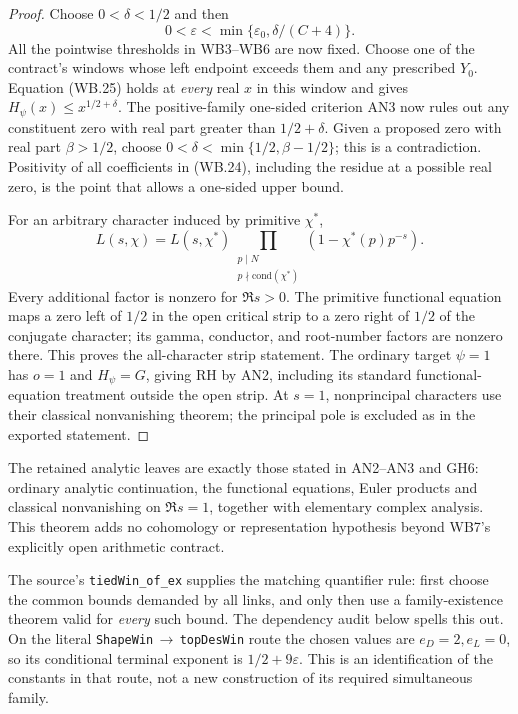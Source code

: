 \begin{proof}
Choose $0<\delta<1/2$ and then
\[
 0<\varepsilon<\min\{\varepsilon_0,\delta/(C+4)\}.
\]
All the pointwise thresholds in WB3--WB6 are now fixed. Choose one
of the contract's windows whose left endpoint exceeds them and any
prescribed $Y_0$. Equation (WB.25) holds at \emph{every} real $x$
in this window and gives $H_\psi(x)\le x^{1/2+\delta}$.
The positive-family one-sided criterion AN3 now rules out any
constituent zero with real part greater than $1/2+\delta$.
Given a proposed zero with real part $\beta>1/2$, choose
$0<\delta<\min\{1/2,\beta-1/2\}$; this is a contradiction. Positivity of
all coefficients in (WB.24), including the residue at a possible
real zero, is the point that allows a one-sided upper bound.

For an arbitrary character induced by primitive $\chi^*$,
\[
 L(s,\chi)=L(s,\chi^*)
       \prod_{\substack{p\mid N\\p\nmid\mathrm{cond}(\chi^*)}}
                       (1-\chi^*(p)p^{-s}).
\]
Every additional factor is nonzero for $\Re s>0$. The primitive
functional equation maps a zero left of $1/2$ in the open critical
strip to a zero right of $1/2$ of the conjugate character; its gamma,
conductor, and root-number factors are nonzero there. This proves
the all-character strip statement. The ordinary target $\psi=1$
has $o=1$ and $H_\psi=G$, giving RH by AN2, including its standard
functional-equation treatment outside the open strip. At $s=1$,
nonprincipal characters use their classical nonvanishing theorem;
the principal pole is excluded as in the exported statement.
\end{proof}

The retained analytic leaves are exactly those stated in AN2--AN3
and GH6: ordinary analytic continuation, the functional equations,
Euler products and classical nonvanishing on $\Re s=1$, together
with elementary complex analysis. This theorem adds no cohomology
or representation hypothesis beyond WB7's explicitly open
arithmetic contract.

The source's \texttt{tiedWin\_of\_ex} supplies the matching
quantifier rule: first choose the common bounds demanded by all
links, and only then use a family-existence theorem valid for
\emph{every} such bound. The dependency audit below spells this out.
On the literal \texttt{ShapeWin}\,$\to$\,\texttt{topDesWin}
route the chosen values are $e_D=2,e_L=0$, so its conditional
terminal exponent is $1/2+9\varepsilon$. This is an identification
of the constants in that route, not a new construction of its
required simultaneous family.
